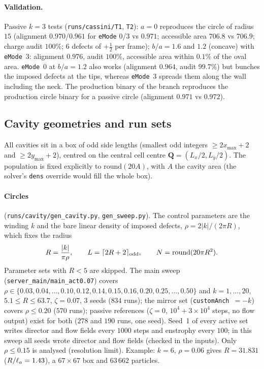 \paragraph{Validation.} Passive $k=3$ tests (\texttt{runs/cassini/T1}, \texttt{T2}): $a=0$ reproduces the circle of radius $15$
(alignment $0.970$/$0.961$ for \texttt{eMode} 0/3 vs $0.971$; accessible area $706.8$ vs $706.9$; charge audit $100\%$;
$6$ defects of $+\tfrac12$ per frame); $b/a=1.6$ and $1.2$ (concave) with \texttt{eMode}~3: alignment $0.976$, audit $100\%$,
accessible area within $0.1\%$ of the oval area. \texttt{eMode}~0 at $b/a=1.2$ also works (alignment $0.964$, audit $99.7\%$)
but bunches the imposed defects at the tips, whereas \texttt{eMode}~3 spreads them along the wall including the neck.
The production binary of the branch reproduces the production circle binary for a passive circle
(alignment $0.971$ vs $0.972$).

\subsection{Cavity geometries and run sets}
\label{sec:md-geom}

All cavities sit in a box of odd side lengths (smallest odd integers $\ge 2x_{\max}+2$ and $\ge2y_{\max}+2$), centred on the
central cell centre $\mathbf Q=(L_x/2,L_y/2)$. The population is fixed explicitly to $\mathrm{round}(20A)$, with $A$ the cavity area
(the solver's \texttt{dens} override would fill the whole box).

\paragraph{Circles} (\texttt{runs/cavity/gen\_cavity.py}, \texttt{gen\_sweep.py}). The control parameters are the winding $k$ and the
bare linear density of imposed defects, $\rho=2|k|/(2\pi R)$, which fixes the radius
\begin{equation}
  R=\frac{|k|}{\pi\rho},\qquad L=\lceil 2R+2\rceil_{\rm odd},\qquad N=\mathrm{round}(20\pi R^2).
\end{equation}
Parameter sets with $R<5$ are skipped. The main sweep (\texttt{server\_main/main\_act0.07}) covers
$\rho\in\{0.03,0.04,\dots,0.10,0.12,0.14,0.15,0.16,0.20,0.25,\dots,0.50\}$ and $k=1,\dots,20$, $5.1\le R\le63.7$, $\zeta=0.07$,
$3$ seeds ($834$ runs); the mirror set (\texttt{customAnch}~$=-k$) covers $\rho\le0.20$ ($570$ runs); passive references
($\zeta=0$, $10^4+3\times10^4$ steps, no flow output) exist for both ($278$ and $190$ runs, one seed). Seed~1 of every active set
writes director and flow fields every $1000$ steps and enstrophy every $100$; in this sweep all seeds wrote director and flow fields
(checked in the inputs). Only $\rho\le0.15$ is analysed (resolution limit). Example: $k=6$, $\rho=0.06$ gives $R=31.831$
($R/\ell_a=1.43$), a $67\times67$ box and $63\,662$ particles.

